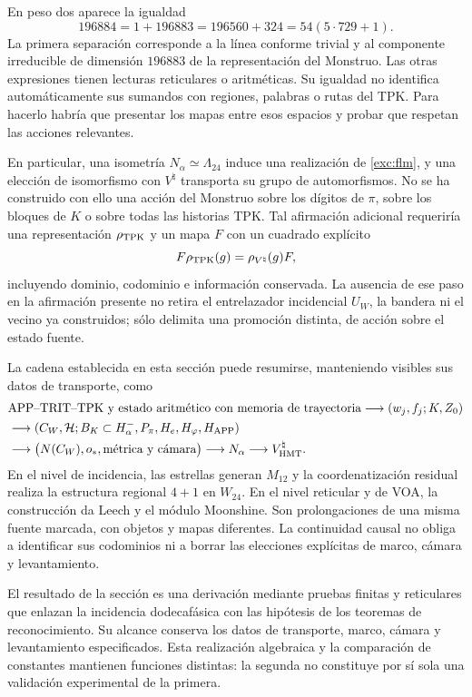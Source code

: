 En peso dos aparece la igualdad
\[
 196884=1+196883=196560+324=54(5\cdot729+1).
\]
La primera separación corresponde a la línea conforme trivial y al
componente irreducible de dimensión $196883$ de la representación
del Monstruo. Las otras expresiones tienen lecturas reticulares o
aritméticas. Su igualdad no identifica automáticamente sus sumandos
con regiones, palabras o rutas del TPK. Para hacerlo habría que
presentar los mapas entre esos espacios y probar que respetan las
acciones relevantes.

En particular, una isometría $N_\alpha\simeq\Lambda_{24}$ induce
una realización de \eqref{exc:flm}, y una elección de isomorfismo
con $V^\natural$ transporta su grupo de automorfismos. No se ha
construido con ello una acción del Monstruo sobre los dígitos de
$\pi$, sobre los bloques de $K$ o sobre todas las historias TPK.
Tal afirmación adicional requeriría una representación
$\rho_{\rm TPK}$ y un mapa $F$ con un cuadrado explícito
\[
 F\rho_{\rm TPK}(g)=\rho_{V^\natural}(g)F,
\]
incluyendo dominio, codominio e información conservada. La ausencia
de ese paso en la afirmación presente no retira el entrelazador
incidencial $U_W$, la bandera ni el vecino ya construidos; sólo
delimita una promoción distinta, de acción sobre el estado fuente.

La cadena establecida en esta sección puede resumirse, manteniendo
visibles sus datos de transporte, como
\begin{align*}
 &\text{APP--TRIT--TPK y estado aritmético con memoria de trayectoria}
   \longrightarrow (w_j,f_j;K,Z_0)\\
 &\longrightarrow (C_W,\mathcal H;B_K\subset H^-_\alpha,
                   P_\pi,H_e,H_\varphi,H_{\rm APP})\\
 &\longrightarrow \bigl(N(C_W),o_*,\text{métrica y cámara}\bigr)
   \longrightarrow N_\alpha
   \longrightarrow V^\natural_{\rm HMT}.
\end{align*}
En el nivel de incidencia, las estrellas generan $M_{12}$ y la
coordenatización residual realiza la estructura regional $4+1$ en $W_{24}$.
En el nivel reticular y de VOA, la construcción da Leech y el módulo
Moonshine. Son prolongaciones de una misma fuente marcada, con
objetos y mapas diferentes. La continuidad causal no obliga a
identificar sus codominios ni a borrar las elecciones explícitas
de marco, cámara y levantamiento.

El resultado de la sección es una derivación mediante pruebas finitas
y reticulares que enlazan la incidencia dodecafásica con las hipótesis de
los teoremas de reconocimiento. Su alcance conserva los datos de
transporte, marco, cámara y levantamiento especificados. Esta realización
algebraica y la comparación de constantes mantienen funciones distintas:
la segunda no constituye por sí sola una validación experimental de la primera.
